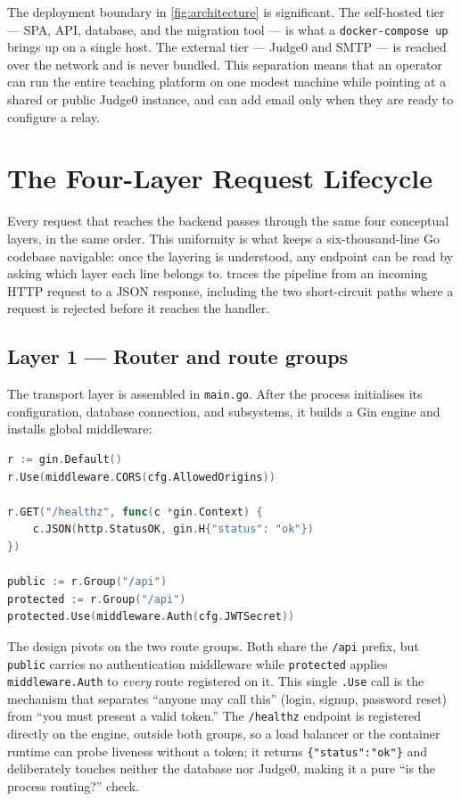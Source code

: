 The deployment boundary in \cref{fig:architecture} is significant. The
self-hosted tier --- SPA, API, database, and the migration tool --- is what a
\texttt{docker-compose up} brings up on a single host. The external tier ---
Judge0 and SMTP --- is reached over the network and is never bundled. This
separation means that an operator can run the entire teaching platform on one
modest machine while pointing at a shared or public Judge0 instance, and can
add email only when they are ready to configure a relay.

\section{The Four-Layer Request Lifecycle}\label{sec:lifecycle}

Every request that reaches the backend passes through the same four conceptual
layers, in the same order. This uniformity is what keeps a six-thousand-line Go
codebase navigable: once the layering is understood, any endpoint can be read
by asking which layer each line belongs to.  traces the
pipeline from an incoming HTTP request to a JSON response, including the two
short-circuit paths where a request is rejected before it reaches the handler.



\subsection{Layer 1 --- Router and route groups}

The transport layer is assembled in \texttt{main.go}. After the process
initialises its configuration, database connection, and subsystems, it builds a
Gin engine and installs global middleware:

\begin{lstlisting}[language=Go,caption={Router construction and route-group split in \texttt{main.go}.},label={lst:router}]
r := gin.Default()
r.Use(middleware.CORS(cfg.AllowedOrigins))

r.GET("/healthz", func(c *gin.Context) {
    c.JSON(http.StatusOK, gin.H{"status": "ok"})
})

public := r.Group("/api")
protected := r.Group("/api")
protected.Use(middleware.Auth(cfg.JWTSecret))
\end{lstlisting}

The design pivots on the two route groups. Both share the \texttt{/api} prefix,
but \texttt{public} carries no authentication middleware while \texttt{protected}
applies \texttt{middleware.Auth} to \emph{every} route registered on it. This
single \texttt{.Use} call is the mechanism that separates ``anyone may call
this'' (login, signup, password reset) from ``you must present a valid token.''
The \texttt{/healthz} endpoint is registered directly on the engine, outside
both groups, so a load balancer or the container runtime can probe liveness
without a token; it returns \texttt{\{"status":"ok"\}} and deliberately touches
neither the database nor Judge0, making it a pure ``is the process routing?''
check.

